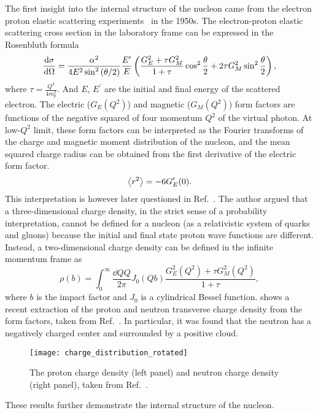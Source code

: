 \documentclass[../main.tex]{subfiles}
\begin{document}
The first insight into the internal structure of the nucleon came from the
electron proton elastic scattering experiments~\cite{hofstadter1956} in the
1950s. The electron-proton elastic scattering cross section in the laboratory
frame can be expressed in the Rosenbluth formula~\cite{rosenbluth1950}
\begin{equation}
	\dv{\sigma}{\Omega} = \frac{\alpha^2}{4E^2 \sin^2\left(\theta/2\right)}
	\frac{E^\prime}{E} \left( \frac{G_E^2+\tau G_M^2}{1+\tau} \cos^2
	\frac{\theta}{2} + 2\tau G_M^2 \sin^2 \frac{\theta}{2}\right)
	\label{eq:ep_cs},
\end{equation}
where $\tau = \frac{Q^2}{4m_p^2}$.
And $E$, $E^\prime$ are the initial and final energy of the scattered electron.
The electric ($G_E\left(Q^2\right)$) and magnetic ($G_M\left(Q^2\right)$) form
factors are functions of the negative squared of four momentum $Q^2$ of the virtual photon. At
low-$Q^2$ limit, these form factors can be interpreted as the Fourier transforms
of the charge and magnetic moment distribution of the nucleon, and the mean squared
charge radius can be obtained from the first derivative of the electric form factor.
\begin{equation}
	\expval{r^2}=-6G^\prime_E(0).
\end{equation}
This interpretation is however later questioned in Ref.~\cite{miller2007,miller2019}.
The author argued that a three-dimensional charge density, in the strict sense of a
probability interpretation, cannot be defined for a nucleon (as a relativistic system of quarks and gluons)
because the initial and final state proton wave functions are different. Instead,
a two-dimensional charge density can be defined in the infinite momentum frame as 
\begin{equation}
	\rho(b)=\int^\infty_0 \frac{\dd{Q}Q}{2\pi} J_0(Qb)\frac{G_E^2(Q^2)+\tau G_M^2(Q^2)}{1+\tau},
\end{equation}
where $b$ is the impact factor and $J_0$ is a cylindrical Bessel function.
shows a recent extraction of the proton and neutron transverse charge density from the
form factors, taken from Ref.~\cite{miller2007}. In particular, it was found that
the neutron has a negatively charged center and surrounded by a positive cloud.
\begin{figure}[hbp!]
	\centering
	\texttt{[image: charge\_distribution\_rotated]}
	\caption{The proton charge density (left panel) and neutron charge density
		(right panel), taken from Ref.~\cite{miller2007}.}
	\label{fig:charge}
\end{figure}
These results further demonstrate the internal structure of the nucleon.
\end{document}
